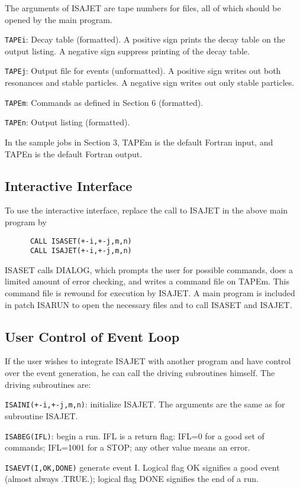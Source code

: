       The arguments of ISAJET are tape numbers for files, all of which
should be opened by the main program.

      \verb|TAPEi|: Decay table (formatted). A positive sign prints
the decay table on the output listing. A negative sign suppress
printing of the decay table.

      \verb|TAPEj|: Output file for events (unformatted). A positive
sign writes out both resonances and stable particles. A negative sign
writes out only stable particles.

      \verb|TAPEm|: Commands as defined in Section 6 (formatted).

      \verb|TAPEn|: Output listing (formatted).

\noindent In the sample jobs in Section 3, TAPEm is the default
Fortran input, and TAPEn is the default Fortran output.

\subsection{Interactive Interface}

      To use the interactive interface, replace the call to ISAJET in
the above main program by
\begin{verbatim}
      CALL ISASET(+-i,+-j,m,n)
      CALL ISAJET(+-i,+-j,m,n)
\end{verbatim}
ISASET calls DIALOG, which prompts the user for possible commands,
does a limited amount of error checking, and writes a command file on
TAPEm. This command file is rewound for execution by ISAJET. A main
program is included in patch ISARUN to open the necessary files and to
call ISASET and ISAJET.

\subsection{User Control of Event Loop}

      If the user wishes to integrate ISAJET with another program and
have control over the event generation, he can call the driving
subroutines himself. The driving subroutines are:

      \verb|ISAINI(+-i,+-j,m,n)|: initialize ISAJET. The arguments are
the same as for subroutine ISAJET.

      \verb|ISABEG(IFL)|: begin a run. IFL is a return flag: IFL=0
for a good set of commands; IFL=1001 for a STOP; any other value means
an error.

      \verb|ISAEVT(I,OK,DONE)| generate event I. Logical flag OK
signifies a good event (almost always .TRUE.); logical flag DONE
signifies the end of a run.

